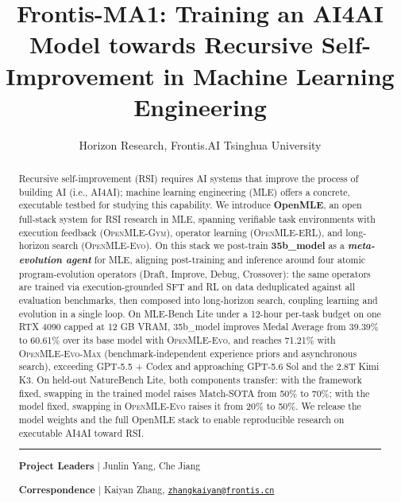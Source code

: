 \documentclass[11pt, a4paper, copyright, frontis-three]{frontis}
\title{Frontis-MA1: Training an AI4AI Model towards Recursive Self-Improvement in Machine Learning Engineering}
\author{Horizon Research, Frontis.AI \quad Tsinghua University \\
  \rule{0pt}{0.3em}\badgerow\vspace{-8pt}}
\newcommand{\openmlegym}{\textsc{OpenMLE-Gym}}
\newcommand{\openmleerl}{\textsc{OpenMLE-ERL}}
\newcommand{\openmleevo}{\textsc{OpenMLE-Evo}}
\newcommand{\openmleevomax}{\textsc{OpenMLE-Evo-Max}}
\newcommand{\thirtyfivebmodel}{\csname 35b_model\endcsname}
\newcommand{\baseThirtyFiveEvoResult}{39.39\%}
\newcommand{\frontisThirtyFiveEvoResult}{60.61\%}
\newcommand{\frontisThirtyFiveEvoMaxResult}{71.21\%}
\begin{document}
\begin{abstract}
Recursive self-improvement (RSI) requires AI systems that improve the process of
building AI (i.e., AI4AI); machine learning engineering (MLE) offers a concrete,
executable testbed for studying this capability.
We introduce \textbf{OpenMLE}, an open full-stack system for RSI research in MLE,
spanning verifiable task environments with execution feedback (\openmlegym{}),
operator learning (\openmleerl{}), and long-horizon search (\openmleevo{}).
On this stack we post-train \textbf{\thirtyfivebmodel{}} as a
\textbf{\emph{meta-evolution agent}} for MLE, aligning post-training and
inference around four atomic program-evolution operators (Draft, Improve, Debug,
Crossover): the same operators are trained via execution-grounded SFT and RL on data
deduplicated against all evaluation benchmarks, then composed into long-horizon
search, coupling learning and evolution in a single loop.
On MLE-Bench Lite under 
a 12-hour per-task budget on one RTX 4090 capped at 12 GB VRAM, \thirtyfivebmodel{} improves Medal Average from
\baseThirtyFiveEvoResult{} to \frontisThirtyFiveEvoResult{} over its base model
with \openmleevo{}, and reaches \frontisThirtyFiveEvoMaxResult{} with
\openmleevomax{} (benchmark-independent experience priors and asynchronous search),
exceeding GPT-5.5 + Codex and approaching
GPT-5.6 Sol and the 2.8T Kimi K3.
On held-out NatureBench Lite, both components transfer: with the framework fixed,
swapping in the trained model raises Match-SOTA from 50\% to 70\%; with the model
fixed, swapping in \openmleevo{} raises it from 20\% to 50\%.
We release the model weights and the full OpenMLE stack to enable reproducible
research on executable AI4AI toward RSI.

\par\vspace{0.2em}
\textcolor{frontiscyan}{\rule{\linewidth}{0.3pt}}
\par\vspace{0.2em}

{\footnotesize\color{frontisgray}
\textbf{\color{black}Project Leaders}
\textcolor{frontiscyan}{$\vert$}
Junlin Yang, Che Jiang\par

\textbf{\color{black}Correspondence}
\textcolor{frontiscyan}{$\vert$}
Kaiyan Zhang,
\href{mailto:zhangkaiyan@frontis.cn}
{\texttt{zhangkaiyan@frontis.cn}}\par

}
\end{abstract}
\end{document}
